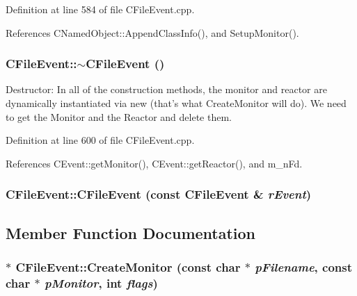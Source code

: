 Definition at line 584 of file CFile\-Event.cpp.

References CNamed\-Object::Append\-Class\-Info(), and Setup\-Monitor().
\subsubsection{\setlength{\rightskip}{0pt plus 5cm}CFile\-Event::$\sim$CFile\-Event ()}\label{classCFileEvent_a9}


Destructor: In all of the construction methods, the monitor and reactor are dynamically instantiated via new (that's what Create\-Monitor will do). We need to get the Monitor and the Reactor and delete them. 

Definition at line 600 of file CFile\-Event.cpp.

References CEvent::get\-Monitor(), CEvent::get\-Reactor(), and m\_\-n\-Fd.
\subsubsection{\setlength{\rightskip}{0pt plus 5cm}CFile\-Event::CFile\-Event (const CFile\-Event \& {\em r\-Event})\hspace{0.3cm}{\tt  [private]}}\label{classCFileEvent_c0}




\subsection{Member Function Documentation}
\subsubsection{ $\ast$ CFile\-Event::Create\-Monitor (const char $\ast$ {\em p\-Filename}, const char $\ast$ {\em p\-Monitor}, int {\em flags})\hspace{0.3cm}{\tt  [protected]}}\label{classCFileEvent_b2}



